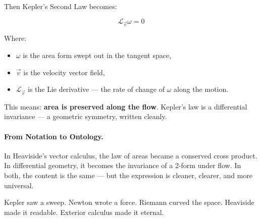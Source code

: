 Then Kepler’s Second Law becomes:

\[
\mathcal{L}_{\vec{v}} \omega = 0
\]

Where:
\begin{itemize}
  \item \( \omega \) is the area form swept out in the tangent space,
  \item \( \vec{v} \) is the velocity vector field,
  \item \( \mathcal{L}_{\vec{v}} \) is the Lie derivative — the rate of change of \( \omega \) along the motion.
\end{itemize}

This means: \textbf{area is preserved along the flow}.  
Kepler’s law is a differential invariance — a geometric symmetry, written cleanly.

\bigskip

\paragraph{From Notation to Ontology.}

In Heaviside’s vector calculus, the law of areas became a conserved cross product.  
In differential geometry, it becomes the invariance of a 2-form under flow.  
In both, the content is the same — but the expression is cleaner, clearer, and more universal.

\bigskip

\begin{tcolorbox}[colback=blue!5!white, colframe=blue!50!black, title=\textbf{Heaviside's Take on Kepler}]
Kepler saw a sweep.  
Newton wrote a force.  
Riemann curved the space.  
Heaviside made it readable.  
Exterior calculus made it eternal.
\end{tcolorbox}
